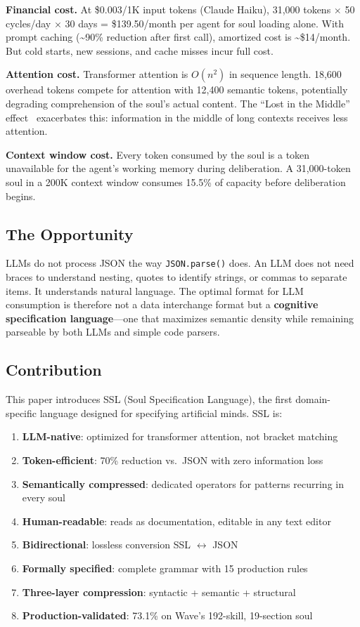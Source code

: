 \documentclass[12pt,a4paper]{article}
\theoremstyle{plain}
\theoremstyle{definition}
\theoremstyle{remark}
\begin{document}
\textbf{Financial cost.} At \$0.003/1K input tokens (Claude Haiku), 31,000 tokens $\times$ 50 cycles/day $\times$ 30 days = \$139.50/month per agent for soul loading alone. With prompt caching (\~{}90\% reduction after first call), amortized cost is \~{}\$14/month. But cold starts, new sessions, and cache misses incur full cost.

\textbf{Attention cost.} Transformer attention is $O(n^2)$ in sequence length. 18,600 overhead tokens compete for attention with 12,400 semantic tokens, potentially degrading comprehension of the soul's actual content. The ``Lost in the Middle'' effect~\cite{liu2023} exacerbates this: information in the middle of long contexts receives less attention.

\textbf{Context window cost.} Every token consumed by the soul is a token unavailable for the agent's working memory during deliberation. A 31,000-token soul in a 200K context window consumes 15.5\% of capacity before deliberation begins.

\subsection{The Opportunity}

LLMs do not process JSON the way \texttt{JSON.parse()} does. An LLM does not need braces to understand nesting, quotes to identify strings, or commas to separate items. It understands natural language. The optimal format for LLM consumption is therefore not a data interchange format but a \textbf{cognitive specification language}---one that maximizes semantic density while remaining parseable by both LLMs and simple code parsers.

\subsection{Contribution}

This paper introduces SSL (Soul Specification Language), the first domain-specific language designed for specifying artificial minds. SSL is:

\begin{enumerate}[nosep]
\item \textbf{LLM-native}: optimized for transformer attention, not bracket matching
\item \textbf{Token-efficient}: 70\% reduction vs.\ JSON with zero information loss
\item \textbf{Semantically compressed}: dedicated operators for patterns recurring in every soul
\item \textbf{Human-readable}: reads as documentation, editable in any text editor
\item \textbf{Bidirectional}: lossless conversion SSL $\leftrightarrow$ JSON
\item \textbf{Formally specified}: complete grammar with 15 production rules
\item \textbf{Three-layer compression}: syntactic + semantic + structural
\item \textbf{Production-validated}: 73.1\% on Wave's 192-skill, 19-section soul
\end{enumerate}
\end{document}
